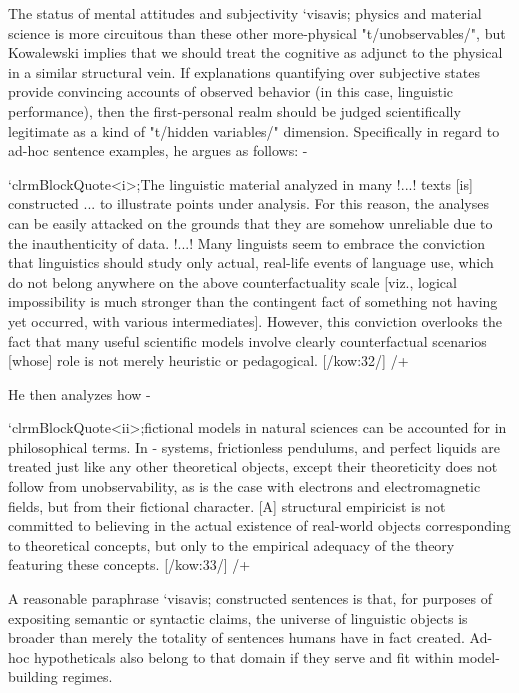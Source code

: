 The status of mental attitudes and subjectivity `visavis; physics and material 
science is more circuitous than these other more-physical "t/unobservables/", 
but Kowalewski implies that we should treat the cognitive as adjunct to the 
physical in a similar structural vein.  If explanations quantifying 
over subjective states provide convincing accounts of observed 
behavior (in this case, linguistic performance), then the first-personal 
realm should be judged scientifically legitimate as a kind of "t/hidden variables/" 
dimension.  Specifically in regard to ad-hoc sentence 
examples, he argues as follows: -%

`clrmBlockQuote<i>;The linguistic material analyzed in many !...! texts [is] constructed 
... to illustrate points under analysis.  
For this reason, the analyses can be easily attacked on the grounds that
they are somehow unreliable due to the inauthenticity of data.  !...!  
Many linguists seem to embrace the conviction that linguistics should
study only actual, real-life events of language use, which do not belong anywhere on the above 
counterfactuality scale [viz., logical impossibility is much stronger 
than the contingent fact of something not having yet occurred, with 
various intermediates].  However, this conviction overlooks the fact 
that many useful scientific models involve clearly counterfactual scenarios 
[whose] role is not merely heuristic or pedagogical. [/kow:32/]
/+ 

He then analyzes how -%

`clrmBlockQuote<ii>;fictional models in natural sciences can be accounted for in
philosophical terms.  In -%
systems, frictionless pendulums, and perfect liquids are treated just like
any other theoretical objects, except their theoreticity does not follow from
unobservability, as is the case with electrons and electromagnetic fields, but
from their fictional character.  [A] structural empiricist is not 
committed to believing in the actual existence of real-world objects corresponding
to theoretical concepts, but only to the empirical adequacy of the theory
featuring these concepts.  [/kow:33/]
/+

A reasonable paraphrase `visavis; constructed sentences is that, for purposes 
of expositing semantic or syntactic claims, the universe of linguistic 
objects is broader than merely the totality of sentences humans have in 
fact created.  Ad-hoc hypotheticals also belong to that 
domain if they serve and fit within model-building regimes.


